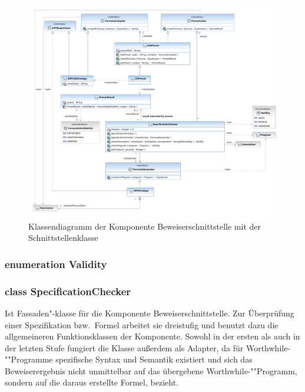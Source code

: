 \begin{figure}[p]%

    \caption{Klassendiagramm der Komponente Beweiserschnittstelle mit
    der Schnittstellenklasse }%

    \hspace{-4cm}%
    \includegraphics[width=1.5\textwidth]{diagrams/prover_component.pdf}%
\end{figure}%

\subsubsection{enumeration Validity}%

\begin{description}%



\end{description}%

\subsubsection{class SpecificationChecker}%

Ist Fassaden"-klasse für die Komponente Beweiserschnittstelle. Zur
Überprüfung einer Spezifikation bzw.\ Formel arbeitet sie dreistufig
und benutzt dazu die allgemeineren Funktionsklassen der Komponente.
Sowohl in der ersten als auch in der letzten Stufe fungiert die Klasse
außerdem als Adapter, da für Worthwhile-""Programme spezifische Syntax
und Semantik existiert und sich das Beweiserergebnis nicht unmittelbar
auf das übergebene Worthwhile-""Programm, sondern auf die daraus
erstellte Formel, bezieht.%

